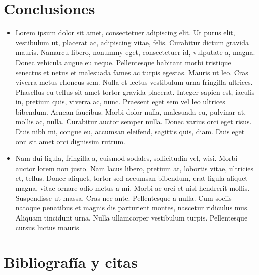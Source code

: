 \documentclass[11pt]{article}
\begin{document}
\section{Conclusiones}

\begin{itemize}[leftmargin=*]
\item 
    Lorem ipsum dolor sit amet, consectetuer adipiscing elit. Ut purus elit, vestibulum ut, placerat ac, adipiscing vitae, felis. Curabitur dictum gravida mauris. Namarcu libero, nonummy eget, consectetuer id, vulputate a, magna. Donec vehicula augue eu neque. Pellentesque habitant morbi tristique senectus et netus et malesuada fames ac turpis egestas. Mauris ut leo. Cras viverra metus rhoncus sem. Nulla et lectus vestibulum urna fringilla ultrices. Phasellus eu tellus sit amet tortor gravida placerat. Integer sapien est, iaculis in, pretium quis, viverra ac, nunc. Praesent eget sem vel leo ultrices bibendum. Aenean faucibus. Morbi dolor nulla, malesuada eu, pulvinar at, mollis ac, nulla. Curabitur auctor semper nulla. Donec varius orci eget risus. Duis nibh mi, congue eu, accumsan eleifend, sagittis quis, diam. Duis eget orci sit amet orci dignissim rutrum.

\item
    Nam dui ligula, fringilla a, euismod sodales, sollicitudin vel, wisi. Morbi auctor lorem non justo. Nam lacus libero, pretium at, lobortis vitae, ultricies et, tellus. Donec aliquet, tortor sed accumsan bibendum, erat ligula aliquet magna, vitae ornare odio metus a mi. Morbi ac orci et nisl hendrerit mollis. Suspendisse ut massa. Cras nec ante. Pellentesque a nulla. Cum sociis natoque penatibus et magnis dis parturient montes, nascetur ridiculus mus. Aliquam tincidunt urna. Nulla ullamcorper vestibulum turpis. Pellentesque cursus luctus mauris
\end{itemize}

\section{Bibliografía y citas}
\end{document}

